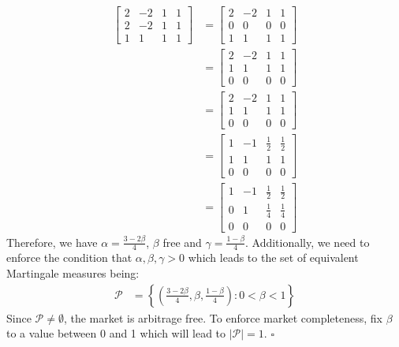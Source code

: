 \documentclass{article}
\begin{document}
\begin{align*}
\left[\begin{array}{ccc|c}
2 & -2 & 1 & 1\\
2 & -2 & 1 & 1\\
1 & 1 & 1 & 1
\end{array} \right] & = 
\left[\begin{array}{ccc|c}
2 & -2 & 1 & 1\\
0 & 0 & 0 & 0\\
1 & 1 & 1 & 1
\end{array} \right] \\
& = \left[\begin{array}{ccc|c}
2 & -2 & 1 & 1\\
1 & 1 & 1 & 1\\
0 & 0 & 0 & 0
\end{array} \right] \\
& = \left[\begin{array}{ccc|c}
2 & -2 & 1 & 1\\
1 & 1 & 1 & 1\\
0 & 0 & 0 & 0
\end{array} \right] \\
& = \left[\begin{array}{ccc|c}
1 & -1 & \frac{1}{2} & \frac{1}{2}\\
1 & 1 & 1 & 1\\
0 & 0 & 0 & 0
\end{array} \right] \\
& = \left[\begin{array}{ccc|c}
1 & -1 & \frac{1}{2} & \frac{1}{2}\\
0 & 1 & \frac{1}{4} & \frac{1}{4}\\
0 & 0 & 0 & 0
\end{array} \right]
\end{align*}
Therefore, we have $\alpha = \frac{3-2\beta}{4}$, $\beta$ free and $\gamma = \frac{1-\beta}{4}$. Additionally, we need to enforce the condition that $\alpha,\beta,\gamma>0$ which leads to the set of equivalent Martingale measures being:
\begin{align*}
    \mathcal{P} & =\left\{ \left(\frac{3-2\beta}{4},\beta,\frac{1-\beta}{4}\right): 0<\beta<1\right\}
\end{align*}
Since $\mathcal{P}\neq\emptyset$, the market is arbitrage free. To enforce market completeness, fix $\beta$ to a value between 0 and 1 which will lead to $|\mathcal{P}| = 1$. $\square$
\end{document}
